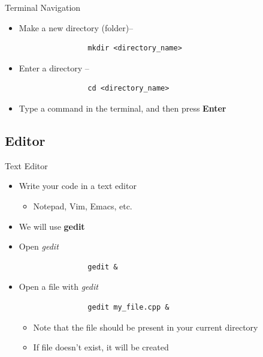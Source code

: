\begin{frame}[fragile]{Terminal Navigation}
    \begin{itemize}
        \item Make a new directory (folder)--
            \begin{verbatim}
                mkdir <directory_name>
            \end{verbatim}
        \item Enter a directory --
            \begin{verbatim}
                cd <directory_name>
            \end{verbatim}
        \item Type a command in the terminal, and then press \textbf{Enter}
    \end{itemize}
\end{frame}

\subsection{Editor}
\begin{frame}[fragile]{Text Editor}
    \begin{itemize}
        \item Write your code in a text editor
            \begin{itemize}
                \item Notepad, Vim, Emacs, etc.
            \end{itemize}
        \pause
        \item We will use \textbf{gedit}
        \pause
        \item Open \emph{gedit}
            \begin{verbatim}
                gedit &
            \end{verbatim}
        \item Open a file with \emph{gedit}
            \begin{verbatim}
                gedit my_file.cpp &
            \end{verbatim}
            \pause
            \begin{itemize}
                \item Note that the file should be present in your current directory
                \item If file doesn't exist, it will be created
            \end{itemize}
    \end{itemize}
\end{frame}
